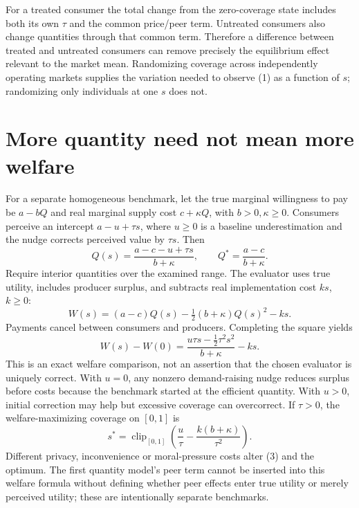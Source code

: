 \documentclass[11pt,a4paper]{article}
\begin{document}
For a treated consumer the total change from the zero-coverage state includes both its own $\tau$ and the common price/peer term. Untreated consumers also change quantities through that common term. Therefore a difference between treated and untreated consumers can remove precisely the equilibrium effect relevant to the market mean. Randomizing coverage across independently operating markets supplies the variation needed to observe (1) as a function of $s$; randomizing only individuals at one $s$ does not.

\section{More quantity need not mean more welfare}
For a separate homogeneous benchmark, let the true marginal willingness to pay be $a-bQ$ and real marginal supply cost $c+\kappa Q$, with $b>0,\kappa\ge0$. Consumers perceive an intercept $a-u+\tau s$, where $u\ge0$ is a baseline underestimation and the nudge corrects perceived value by $\tau s$. Then
\[
 Q(s)=\frac{a-c-u+\tau s}{b+\kappa},\qquad
 Q^*=\frac{a-c}{b+\kappa}.
\]
Require interior quantities over the examined range. The evaluator uses true utility, includes producer surplus, and subtracts real implementation cost $ks$, $k\ge0$:
\[
 W(s)=(a-c)Q(s)-\tfrac12(b+\kappa)Q(s)^2-ks.
\]
Payments cancel between consumers and producers. Completing the square yields
\[
 W(s)-W(0)=\frac{u\tau s-\tfrac12\tau^2s^2}{b+\kappa}-ks. \tag{3}
\]
This is an exact welfare comparison, not an assertion that the chosen evaluator is uniquely correct. With $u=0$, any nonzero demand-raising nudge reduces surplus before costs because the benchmark started at the efficient quantity. With $u>0$, initial correction may help but excessive coverage can overcorrect. If $\tau>0$, the welfare-maximizing coverage on $[0,1]$ is
\[
 s^*=\operatorname{clip}_{[0,1]}
 \left(\frac{u}{\tau}-\frac{k(b+\kappa)}{\tau^2}\right).
\]
Different privacy, inconvenience or moral-pressure costs alter (3) and the optimum. The first quantity model's peer term cannot be inserted into this welfare formula without defining whether peer effects enter true utility or merely perceived utility; these are intentionally separate benchmarks.
\end{document}
